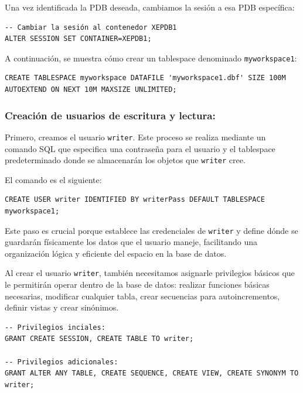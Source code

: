 \documentclass{article}
\begin{document}
Una vez identificada la PDB deseada, cambiamos la sesión a esa PDB específica:

\begin{lstlisting}[style=bashStyle]
-- Cambiar la sesión al contenedor XEPDB1
ALTER SESSION SET CONTAINER=XEPDB1;
\end{lstlisting}

A continuación, se muestra cómo crear un tablespace denominado \texttt{myworkspace1}:

\begin{lstlisting}[style=bashStyle]
CREATE TABLESPACE myworkspace DATAFILE 'myworkspace1.dbf' SIZE 100M AUTOEXTEND ON NEXT 10M MAXSIZE UNLIMITED;
\end{lstlisting}

\vspace{5mm}
\subsubsection{Creación de usuarios de escritura y lectura:}

Primero, creamos el usuario \texttt{writer}. Este proceso se realiza mediante un comando SQL que especifica una contraseña para el usuario y el tablespace predeterminado donde se almacenarán los objetos que \texttt{writer} cree. 

El comando es el siguiente:

\begin{lstlisting}[style=bashStyle]
CREATE USER writer IDENTIFIED BY writerPass DEFAULT TABLESPACE myworkspace1;
\end{lstlisting}

Este paso es crucial porque establece las credenciales de \texttt{writer} y define dónde se guardarán físicamente los datos que el usuario maneje, facilitando una organización lógica y eficiente del espacio en la base de datos.

Al crear el usuario \texttt{writer}, también necesitamos asignarle privilegios básicos que le permitirán operar dentro de la base de datos: realizar funciones básicas necesarias, modificar cualquier tabla, crear secuencias para autoincrementos, definir vistas y crear sinónimos.

\begin{lstlisting}[style=bashStyle]
-- Privilegios inciales:
GRANT CREATE SESSION, CREATE TABLE TO writer;

-- Privilegios adicionales:
GRANT ALTER ANY TABLE, CREATE SEQUENCE, CREATE VIEW, CREATE SYNONYM TO writer;
\end{lstlisting}
\end{document}
